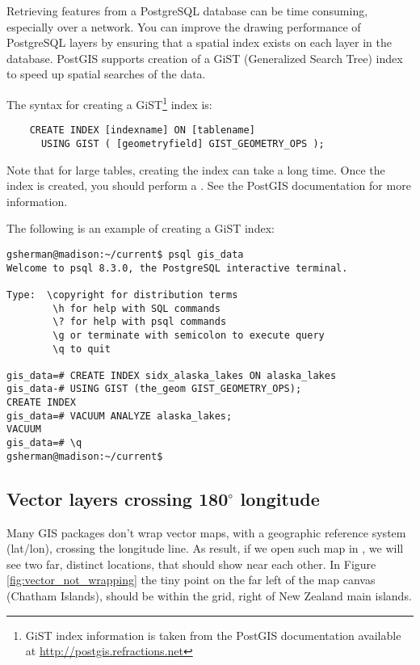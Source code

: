 Retrieving features from a PostgreSQL database can be time consuming,
especially over a network. You can improve the drawing performance of
PostgreSQL layers by ensuring that a  spatial
index
exists on each layer in the database. PostGIS supports creation of a
 GiST
(Generalized Search Tree) index to speed up spatial searches of the data.

The syntax for creating a GiST\footnote{GiST index information is taken from the PostGIS
documentation available at \url{http://postgis.refractions.net}}
index is:

\begin{verbatim}
    CREATE INDEX [indexname] ON [tablename]
      USING GIST ( [geometryfield] GIST_GEOMETRY_OPS );
\end{verbatim}

Note that for large tables, creating the index can take a long time. Once the
index is created, you should perform a . See the
PostGIS documentation \cite{PostGISweb} for more information.

The following is an example of creating a GiST index:
\begin{verbatim}
gsherman@madison:~/current$ psql gis_data
Welcome to psql 8.3.0, the PostgreSQL interactive terminal.

Type:  \copyright for distribution terms
        \h for help with SQL commands
        \? for help with psql commands
        \g or terminate with semicolon to execute query
        \q to quit

gis_data=# CREATE INDEX sidx_alaska_lakes ON alaska_lakes
gis_data-# USING GIST (the_geom GIST_GEOMETRY_OPS);
CREATE INDEX
gis_data=# VACUUM ANALYZE alaska_lakes;
VACUUM
gis_data=# \q
gsherman@madison:~/current$
\end{verbatim}

\subsection{Vector layers crossing 180$^\circ$ longitude}

Many GIS packages don't wrap vector maps, with a geographic reference system
(lat/lon), crossing the  longitude line. As result, if
we open such map in \qg, we will see two far, distinct locations, that
should show near each other. In Figure \ref{fig:vector_not_wrapping} the tiny
point on the far left of the map canvas (Chatham Islands), should be within
the grid, right of New Zealand main islands.

